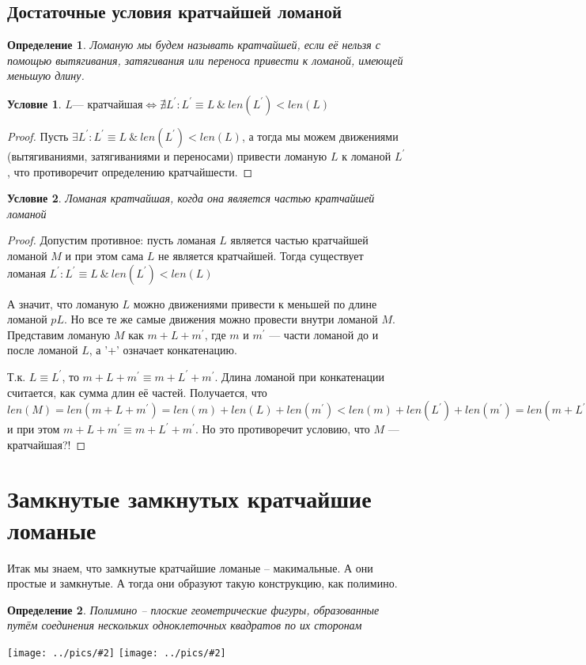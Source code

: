 \documentclass[12pt,a4paper, flushleft]{article}
\newtheorem{Def}{Определение}[section]
\newtheorem{Con}{Условие}[section]
\newcommand{\p}[1]{#1^{\prime}}
\newcommand{\gr}[2]{\texttt{[image: ../pics/\#2]}}
\begin{document}
\subsection{Достаточные условия кратчайшей ломаной}
\begin{Def}
Ломаную мы будем называть кратчайшей, если её нельзя с помощью вытягивания, затягивания
или переноса привести к ломаной, имеющей меньшую длину.
\end{Def}

\begin{Con}
	$L \text{--- кратчайшая}\Longleftrightarrow\nexists \p L: \p L\equiv L ~\&~ len(\p L)<len(L)$
\end{Con}
\begin{proof}
	Пусть $\exists \p L: \p L\equiv L ~\&~ len(\p L)<len(L)$, а тогда мы можем движениями (вытягиваниями, затягиваниями и переносами) привести ломаную $L$  к ломаной $\p L$, что противоречит определению кратчайшести.
\end{proof}	

\begin{Con}
	Ломаная кратчайшая, когда она является частью кратчайшей ломаной
\end{Con}
\begin{proof}
	Допустим противное: пусть ломаная $L$ является частью кратчайшей ломаной $M$ и при этом сама $L$ не является кратчайшей. Тогда существует ломаная $\p L: \p L\equiv L~\&~ len(\p L)<len(L)$
	
	А значит, что ломаную $L$ можно движениями привести к меньшей по длине ломаной $p L$. Но все те же самые движения можно провести внутри ломаной $M$. Представим ломаную $M$ как $m + L + \p m$, где $m$ и $\p m$ --- части ломаной до и после ломаной $L$, а '+' означает конкатенацию. 
	
	Т.к. $L\equiv \p L$, то $m + L + \p m\equiv m+\p L + \p m$. Длина ломаной при конкатенации считается, как сумма длин её частей. Получается, что $len(M) = len(m+L+\p m) = len(m) + len(L) + len(\p m) < len(m) + len(\p L) + len(\p m) = len(m+\p L + \p m)$ и при этом $m+L+\p m\equiv m+\p L+\p m$. Но это противоречит условию, что $M$ --- кратчайшая?!
	
	
\end{proof}

\section{Замкнутые замкнутых кратчайшие ломаные}

Итак мы знаем, что замкнутые кратчайшие ломаные -- макимальные. А они простые и замкнутые. А тогда они образуют такую конструкцию, как полимино.

\begin{Def}
	Полимино -- плоские геометрические фигуры, образованные путём соединения нескольких одноклеточных квадратов по их сторонам
\end{Def}

\gr{0.4}{babaBaBAAA}
\gr{0.4}{bbbaBBaBAA}
\end{document}
